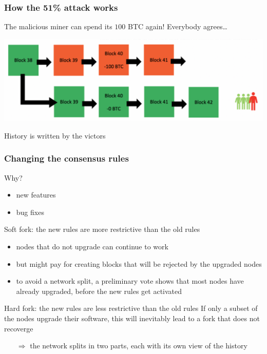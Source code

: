 \documentclass[11pt]{beamer}  %
\begin{document}
\begin{frame}\frametitle{How the 51\% attack works}

  \begin{greenbox}{The malicious miner can spend its $100$ BTC again! Everybody agrees\ldots}
  \begin{center}
    \includegraphics[width=\textwidth,clip=false]{pictures/51attack_4.png}
  \end{center}
  \end{greenbox}

  \bigskip

  \begin{center}
    History is written by the victors
  \end{center}

  \end{frame}

\begin{frame}\frametitle{Changing the consensus rules}

  \begin{greenbox}{Why?}
    \begin{itemize}
    \item new features
    \item bug fixes
    \end{itemize}
  \end{greenbox}

  \bigskip

  \begin{greenbox}{Soft fork: the new rules are more restrictive than the old rules}
    \begin{itemize}
    \item nodes that do not upgrade can continue to work
    \item but might pay for creating blocks that will be rejected by the upgraded nodes
    \item to avoid a network split, a preliminary vote shows that
      most nodes have already upgraded, before the new rules get activated
    \end{itemize}
  \end{greenbox}

  \bigskip

  \begin{redbox}{Hard fork: the new rules are less restrictive than the old rules}
    If only a subset of the nodes upgrade their software, this will inevitably
    lead to a fork that does not recoverge
    \begin{itemize}
    \item[$\Rightarrow$] the network splits in two parts, each with its own view of the history
    \end{itemize}
  \end{redbox}

\end{frame}
\end{document}
